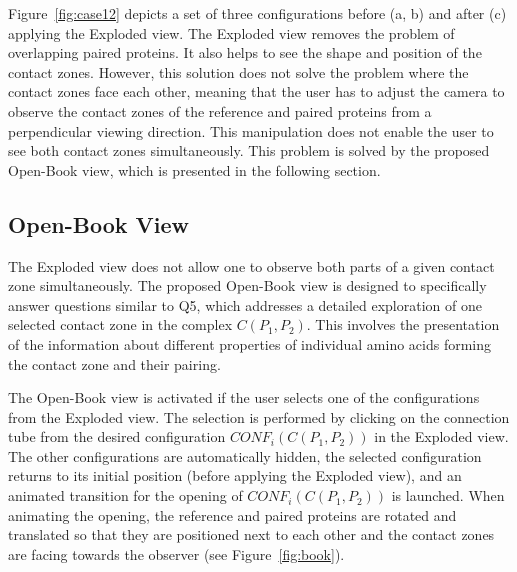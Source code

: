 \documentclass{bmcart}
\def\OpBook {Open-Book view\xspace}
\def\ExpView {Exploded view\xspace}
\begin{document}
Figure~\ref{fig:case12} depicts a set of three configurations before (a, b) and after (c) applying the \ExpView.
The Exploded view removes the problem of overlapping paired proteins.
It also helps to see the shape and position of the contact zones.
However, this solution does not solve the problem where the contact zones face each other, meaning that the user has to adjust the camera to observe the contact zones of the reference and paired proteins from a perpendicular viewing direction. 
This manipulation does not enable the user to see both contact zones simultaneously.
This problem is solved by the proposed \OpBook, which is presented in the following section.



\subsection*{Open-Book View}
The \ExpView does not allow one to observe both parts of a given contact zone simultaneously.
The proposed \OpBook is designed to specifically answer questions similar to Q5, which addresses a detailed exploration of one selected contact zone in the complex $C(P_1,P_2)$.
This involves the presentation of the information about different properties of individual amino acids forming the contact zone and their pairing.

The \OpBook is activated if the user selects one of the configurations from the \ExpView. 
The selection is performed by clicking on the connection tube from the desired configuration $CONF_i(C(P_1,P_2))$ in the \ExpView.
The other configurations are automatically hidden, the selected configuration returns to its initial position (before applying the \ExpView), and an animated transition for the opening of $CONF_i(C(P_1,P_2))$ is launched.
When animating the opening, the reference and paired proteins are rotated and translated so that they are positioned next to each other and the contact zones are facing towards the observer (see Figure~\ref{fig:book}). 
\end{document}
